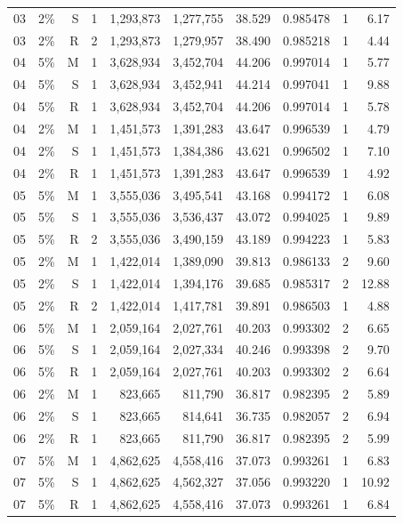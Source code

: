 \documentclass[UTF8,10pt,a4paper]{ctexart}
\begin{document}
\begin{longtable}{llrlrrrlrr}
03 & 2\% & S & 1 & 1,293,873 & 1,277,755 & 38.529 & 0.985478 & 1 & 6.17 \\
03 & 2\% & R & 2 & 1,293,873 & 1,279,957 & 38.490 & 0.985218 & 1 & 4.44 \\
04 & 5\% & M & 1 & 3,628,934 & 3,452,704 & 44.206 & 0.997014 & 1 & 5.77 \\
04 & 5\% & S & 1 & 3,628,934 & 3,452,941 & 44.214 & 0.997041 & 1 & 9.88 \\
04 & 5\% & R & 1 & 3,628,934 & 3,452,704 & 44.206 & 0.997014 & 1 & 5.78 \\
04 & 2\% & M & 1 & 1,451,573 & 1,391,283 & 43.647 & 0.996539 & 1 & 4.79 \\
04 & 2\% & S & 1 & 1,451,573 & 1,384,386 & 43.621 & 0.996502 & 1 & 7.10 \\
04 & 2\% & R & 1 & 1,451,573 & 1,391,283 & 43.647 & 0.996539 & 1 & 4.92 \\
05 & 5\% & M & 1 & 3,555,036 & 3,495,541 & 43.168 & 0.994172 & 1 & 6.08 \\
05 & 5\% & S & 1 & 3,555,036 & 3,536,437 & 43.072 & 0.994025 & 1 & 9.89 \\
05 & 5\% & R & 2 & 3,555,036 & 3,490,159 & 43.189 & 0.994223 & 1 & 5.83 \\
05 & 2\% & M & 1 & 1,422,014 & 1,389,090 & 39.813 & 0.986133 & 2 & 9.60 \\
05 & 2\% & S & 1 & 1,422,014 & 1,394,176 & 39.685 & 0.985317 & 2 & 12.88 \\
05 & 2\% & R & 2 & 1,422,014 & 1,417,781 & 39.891 & 0.986503 & 1 & 4.88 \\
06 & 5\% & M & 1 & 2,059,164 & 2,027,761 & 40.203 & 0.993302 & 2 & 6.65 \\
06 & 5\% & S & 1 & 2,059,164 & 2,027,334 & 40.246 & 0.993398 & 2 & 9.70 \\
06 & 5\% & R & 1 & 2,059,164 & 2,027,761 & 40.203 & 0.993302 & 2 & 6.64 \\
06 & 2\% & M & 1 & 823,665 & 811,790 & 36.817 & 0.982395 & 2 & 5.89 \\
06 & 2\% & S & 1 & 823,665 & 814,641 & 36.735 & 0.982057 & 2 & 6.94 \\
06 & 2\% & R & 1 & 823,665 & 811,790 & 36.817 & 0.982395 & 2 & 5.99 \\
07 & 5\% & M & 1 & 4,862,625 & 4,558,416 & 37.073 & 0.993261 & 1 & 6.83 \\
07 & 5\% & S & 1 & 4,862,625 & 4,562,327 & 37.056 & 0.993220 & 1 & 10.92 \\
07 & 5\% & R & 1 & 4,862,625 & 4,558,416 & 37.073 & 0.993261 & 1 & 6.84 \\

\end{longtable}
\end{document}
